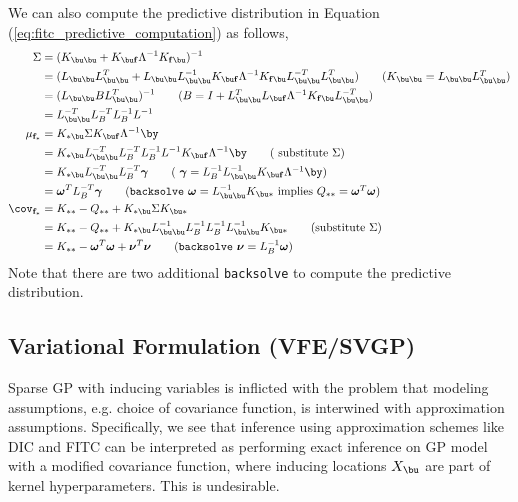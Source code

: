 \documentclass[11pt]{article}
\renewcommand\bf{\ensuremath{\mathbf{f}}}
\begin{document}
We can also compute the predictive distribution in Equation (\ref{eq:fitc_predictive_computation}) as follows,
\begin{align*}
    \Sigma
        &= (K_{\bu\bu} + K_{\bu\bf}\Lambda^{-1}K_{\bf\bu})^{-1} \\
        &= (L_{\bu\bu} L_{\bu\bu}^T + L_{\bu\bu} L_{\bu\bu}^{-1} K_{\bu\bf}\Lambda^{-1}K_{\bf\bu} L_{\bu\bu}^{-T} L_{\bu\bu}^T ) 
            \tag{$K_{\bu\bu} = L_{\bu\bu} L_{\bu\bu}^T$} \\
        &= (L_{\bu\bu} B L_{\bu\bu}^T)^{-1}
            \tag{$B = I + L_{\bu\bu}^TL_{\bu\bf} \Lambda^{-1} K_{\bf\bu} L_{\bu\bu}^{-T}$} \\
        &= L_{\bu\bu}^{-T} L_{B}^{-T} L_{B}^{-1} L^{-1} \\
    \mu_{\bf_*}
        &= K_{*\bu}\Sigma K_{\bu\bf} \Lambda^{-1} \by \\ 
        &= K_{*\bu}  L_{\bu\bu}^{-T} L_{B}^{-T} L_{B}^{-1} L^{-1} K_{\bu\bf} \Lambda^{-1} \by 
            \tag{ substitute $\Sigma$} \\
        &= K_{*\bu}  L_{\bu\bu}^{-T} L_{B}^{-T} \bgamma
            \tag{ $\bgamma = L_B^{-1}L_{\bu\bu}^{-1} K_{\bu\bf} \Lambda^{-1}\by $} \\
        &= \bomega^T L_{B}^{-T} \bgamma 
            \tag{\texttt{backsolve} $\bomega = L_{\bu\bu}^{-1} K_{\bu *}$ implies $Q_{**}=\bomega^T\bomega$} \\
    \cov_{\bf_*}
        &= K_{**} - Q_{**} + K_{*\bu}\Sigma K_{\bu*} \\
        &= K_{**} - Q_{**} + K_{*\bu} L_{\bu\bu}^{-1} L_B^{-1} L_B^{-1} L_{\bu\bu}^{-1} K_{\bu *} 
            \tag{substitute $\Sigma$} \\
        &= K_{**} - \bomega^T \bomega + \bnu^T \bnu 
            \tag{\texttt{backsolve} $\bnu = L_B^{-1} \bomega$}
\end{align*}
Note that there are two additional \texttt{backsolve} to compute the predictive distribution.





\subsection{Variational Formulation (VFE/SVGP)}


Sparse GP with inducing variables is inflicted with the problem that modeling assumptions, e.g. choice of covariance function, is interwined with approximation assumptions. Specifically, we see that inference using approximation schemes like DIC and FITC can be interpreted as performing exact inference on GP model with a modified covariance function, where inducing locations $X_{\bu}$ are part of kernel hyperparameters. This is undesirable.
\end{document}
